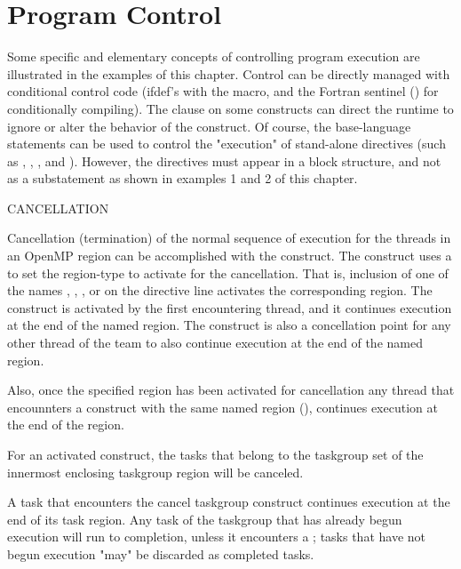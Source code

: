 \pagebreak
\chapter{Program Control}
\label{sec:program_control}

Some specific and elementary concepts of controlling program execution are
illustrated in the examples of this chapter.  Control can be directly
managed with conditional control code (ifdef's with the  
macro, and the Fortran sentinel (\code{!\$}) 
for conditionally compiling). The  clause on some constructs
can direct the runtime to ignore or alter the behavior of the construct.
Of course, the base-language  statements can be used to control the "execution" 
of stand-alone directives (such as , , , 
and  ).
However, the directives must appear in a block structure, and not as a substatement as shown in examples 1 and 2 of this chapter.


CANCELLATION

Cancellation (termination) of the normal sequence of execution for the threads in an OpenMP region can
be  accomplished with the  construct.  The construct uses a
 to set the region-type to activate for the cancellation. 
That is, inclusion  of one of the  names , , 
,  or  on the directive line 
activates the corresponding region.  
The  construct is activated by the first encountering thread,  and it
continues execution at the end of the named region.
The  construct is also a concellation point for any other thread of the team 
to also continue execution at the end of the named region.  

Also, once the specified region has been activated for cancellation any thread that encounnters 
a  construct with the same named region (),
continues execution at the end of the region.

For an activated  construct, the tasks that
belong to the taskgroup set of the innermost enclosing taskgroup region will be canceled. 

A task that encounters the cancel taskgroup construct continues execution at the end of its
task region. Any task of the taskgroup that has already begun execution will run to completion,
unless it encounters a ; tasks that have not begun execution "may" be
discarded as completed tasks.

